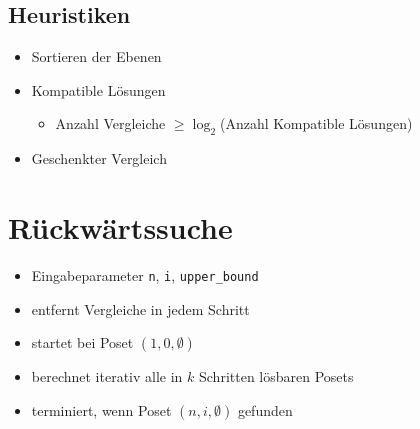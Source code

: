 \subsection{Heuristiken}

\begin{frame}{\insertsubsection}

  \begin{itemize}
    \item<+-> Sortieren der Ebenen
    \item<+-> Kompatible Lösungen
      \begin{itemize}
        \item Anzahl Vergleiche $\geq \log_2$(Anzahl Kompatible Lösungen)
      \end{itemize}
    \item<+-> Geschenkter Vergleich
      \begin{figure}
        \centering
      \end{figure}
  \end{itemize}

\end{frame}


\section{Rückwärtssuche}
\sectionframe{\insertsection}
\begin{frame}{\insertsection}
  \begin{itemize}
    \item<+-> Eingabeparameter \texttt{n}, \texttt{i}, \texttt{upper\_bound}
    \item<+-> entfernt Vergleiche in jedem Schritt
    \item<+-> startet bei Poset $(1, 0, \emptyset)$ %
    \item<+-> berechnet iterativ alle in $k$ Schritten lösbaren Posets %
    \item<+-> terminiert, wenn Poset $(n, i, \emptyset)$ gefunden %
  \end{itemize}
\end{frame}

